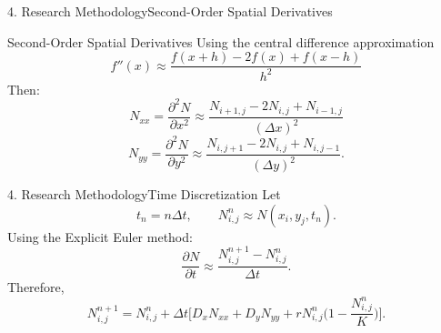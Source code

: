 \documentclass[10pt]{beamer}
\begin{document}
    \begin{frame}{4. Research Methodology}{Second-Order Spatial Derivatives}
      \begin{block}{Second-Order Spatial Derivatives}
          Using the central difference approximation $$f''(x) \approx \dfrac{f(x+h) - 2f(x) + f(x-h)}{h^2}$$
          Then:
          $$
          N_{xx} = \frac{\partial^2N}{\partial x^2}
          \approx
          \frac{N_{i+1,j}-2N_{i,j}+N_{i-1,j}}
          {(\Delta x)^2}
          $$
          $$
          N_{yy} = \frac{\partial^2N}{\partial y^2}
          \approx
          \frac{N_{i,j+1}-2N_{i,j}+N_{i,j-1}}
          {(\Delta y)^2}.
          $$
      \end{block}
    \end{frame}
    \begin{frame}{4. Research Methodology}{Time Discretization}
      Let
      $$
      t_n=n\Delta t,
      \qquad
      N_{i,j}^n\approx N(x_i,y_j,t_n).
      $$
      Using the Explicit Euler method:
      $$
      \frac{\partial N}{\partial t}
      \approx
      \frac{N_{i,j}^{n+1}-N_{i,j}^{n}}
      {\Delta t}.
      $$
      Therefore,
      $$
      N_{i,j}^{n+1}
      =
      N_{i,j}^{n}
      +
      \Delta t \Big[D_x N_{xx} + D_y N_{yy} + rN^n_{i, j} \Big(1 - \dfrac{N^n_{i, j}}{K} \Big)\Big].
      $$
    \end{frame}
\end{document}
